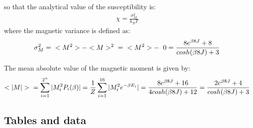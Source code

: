 \documentclass[12pt,english,a4paper]{article}
\begin{document}
so that the analytical value of the susceptibility is:
\begin{align*}
    \chi = \frac{\sigma_M^2}{k_BT}
\end{align*}
where the magnetic variance is defined as:
\begin{align*}
    \sigma_M^2 = \hspace{0.2cm} <M^2> - <M>^2 \hspace{0.2cm}
               = \hspace{0.2cm} <M^2> - \hspace{0.2cm} 0
               = \frac{8e^{\beta 8J} + 8}{cosh(\beta 8J) + 3}
\end{align*}

\noindent The mean absolute value of the magnetic moment is given by: 
\begin{align*}
    <|M|> \hspace{0.2cm} 
          = \sum_{i=1}^{2^n} |M_i^2P_i(\beta)| 
          = \frac{1}{Z} \sum_{i=1}^{16} |M_i^2e^{-\beta E_i}|
          = \frac{8e^{\beta 8J} + 16}{4cosh(\beta 8J) + 12}
          = \frac{2e^{\beta 8J} + 4}{cosh(\beta 8J) + 3}
\end{align*}






\subsection{Tables and data}

\printbibliography
\end{document}
